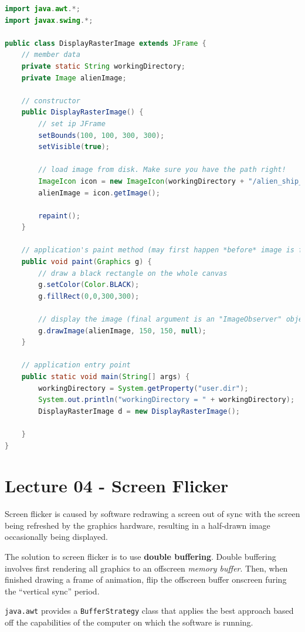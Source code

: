 \documentclass[11pt]{article}
\begin{document}
\begin{lstlisting}[language=Java] 
import java.awt.*;
import javax.swing.*;

public class DisplayRasterImage extends JFrame {
    // member data
    private static String workingDirectory; 
    private Image alienImage; 

    // constructor 
    public DisplayRasterImage() {
        // set ip JFrame 
        setBounds(100, 100, 300, 300); 
        setVisible(true); 

        // load image from disk. Make sure you have the path right! 
        ImageIcon icon = new ImageIcon(workingDirectory + "/alien_ship_1.png");
        alienImage = icon.getImage(); 

        repaint();
    }

    // application's paint method (may first happen *before* image is finished loading, hence repaint() above 
    public void paint(Graphics g) {
        // draw a black rectangle on the whole canvas 
        g.setColor(Color.BLACK);
        g.fillRect(0,0,300,300);

        // display the image (final argument is an "ImageObserver" object)
        g.drawImage(alienImage, 150, 150, null); 
    }

    // application entry point 
    public static void main(String[] args) {
        workingDirectory = System.getProperty("user.dir");
        System.out.println("workingDirectory = " + workingDirectory); 
        DisplayRasterImage d = new DisplayRasterImage(); 

    }
}
\end{lstlisting} 

\section{Lecture 04 - Screen Flicker} 
Screen flicker is caused by software redrawing a screen out of sync with the screen being refreshed by the graphics hardware, 
resulting in a half-drawn image occasionally being displayed. 

The solution to screen flicker is to use \textbf{double buffering}. 
Double buffering involves first rendering all graphics to an offscreen \textit{memory buffer}.  
Then, when finished drawing a frame of animation, flip the offscreen buffer onscreen furing the ``vertical sync'' period. 

\verb|java.awt| provides a \verb|BufferStrategy| class that applies the best approach based off the capabilities of the 
computer on which the software is running.
\end{document}
